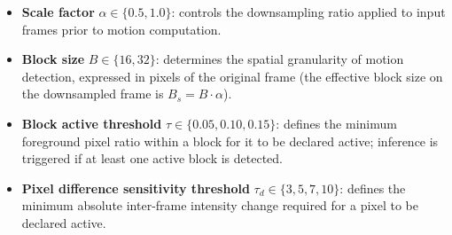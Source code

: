 \documentclass[final,3p,times,twocolumn]{elsarticle}
\begin{document}
\begin{itemize}
\item \textbf{Scale factor} $\alpha \in \{0.5, 1.0\}$: controls the
downsampling ratio applied to input frames prior to motion computation.
\item \textbf{Block size} $B \in \{16, 32\}$: determines the spatial
granularity of motion detection, expressed in pixels of the original
frame (the effective block size on the downsampled frame is
$B_s = B \cdot \alpha$).
\item \textbf{Block active threshold} $\tau \in \{0.05, 0.10, 0.15\}$:
defines the minimum foreground pixel ratio within a block for it to be
declared active; inference is triggered if at least one active block
is detected.
\item \textbf{Pixel difference sensitivity threshold}
$\tau_d \in \{3, 5, 7, 10\}$: defines the minimum absolute inter-frame
intensity change required for a pixel to be declared active.
\end{itemize}

\begin{table}[t]
\caption{Representative \textsc{FrameDiffDet} hyperparameter
configurations evaluated on the validation set, illustrating the
recall--efficiency trade-off across the full search space of 48
configurations (subset shown for brevity). Configurations with a
ranking score of ``-'' violate the recall constraint ($\delta_R =
0.015$) and are included solely to illustrate the trade-off at higher
skip rates. Recall (\%) reports the retained recall with the absolute
drop relative to the baseline in parentheses, i.e., $R\ (-\Delta R)$.
The best and second-best values per metric are highlighted in
\textbf{bold} and \underline{\textit{italic underline}}, respectively.}
\label{tb:val_results_frameDiff}
\end{table}
\end{document}
